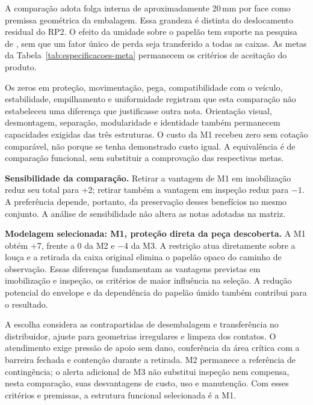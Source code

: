 A comparação adota folga interna de aproximadamente 20\,mm por face como premissa geométrica da embalagem. Essa grandeza é distinta do deslocamento residual do RP2. O efeito da umidade sobre o papelão tem suporte na pesquisa de \citet{brown2019}, sem que um fator único de perda seja transferido a todas as caixas. As metas da Tabela~\ref{tab:especificacoes-meta} permanecem os critérios de aceitação do produto.

Os zeros em proteção, movimentação, pega, compatibilidade com o veículo, estabilidade, empilhamento e uniformidade registram que esta comparação não estabeleceu uma diferença que justificasse outra nota. Orientação visual, desmontagem, separação, modularidade e identidade também permanecem capacidades exigidas das três estruturas. O custo da M1 recebeu zero sem cotação comparável, não porque se tenha demonstrado custo igual. A equivalência é de comparação funcional, sem substituir a comprovação das respectivas metas.

\noindent\textbf{Sensibilidade da comparação.} Retirar a vantagem de M1 em imobilização reduz seu total para +2; retirar também a vantagem em inspeção reduz para $-1$. A preferência depende, portanto, da preservação desses benefícios no mesmo conjunto. A análise de sensibilidade não altera as notas adotadas na matriz.

\noindent\textbf{Modelagem selecionada: M1, proteção direta da peça descoberta.} A M1 obtém +7, frente a 0 da M2 e $-4$ da M3. A restrição atua diretamente sobre a louça e a retirada da caixa original elimina o papelão opaco do caminho de observação. Essas diferenças fundamentam as vantagens previstas em imobilização e inspeção, os critérios de maior influência na seleção. A redução potencial do envelope e da dependência do papelão úmido também contribui para o resultado.

A escolha considera as contrapartidas de desembalagem e transferência no distribuidor, ajuste para geometrias irregulares e limpeza dos contatos. O atendimento exige pressão de apoio sem dano, conferência da área crítica com a barreira fechada e contenção durante a retirada. M2 permanece a referência de contingência; o alerta adicional de M3 não substitui inspeção nem compensa, nesta comparação, suas desvantagens de custo, uso e manutenção. Com esses critérios e premissas, a estrutura funcional selecionada é a M1.
